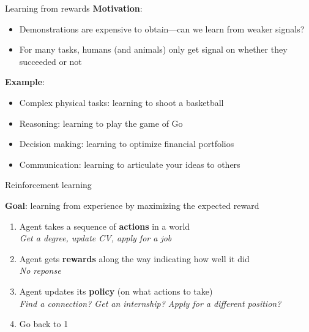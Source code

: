 \documentclass[usenames,dvipsnames,notes,11pt,aspectratio=169,hyperref={colorlinks=true, linkcolor=blue}]{beamer}
\begin{document}
\begin{frame}
    {Learning from rewards}
        \textbf{Motivation}:\\
            \begin{itemize}
                \item Demonstrations are expensive to obtain---can we learn from weaker signals?
                \item For many tasks, humans (and animals) only get signal on whether they succeeded or not 
            \end{itemize}

        \textbf{Example}:\\
            \begin{itemize}
                \item Complex physical tasks: learning to shoot a basketball 
                \item Reasoning: learning to play the game of Go 
                \item Decision making: learning to optimize financial portfolios
                \item Communication: learning to articulate your ideas to others
            \end{itemize}
\end{frame}

\begin{frame}
    {Reinforcement learning}

            {\bf Goal}: learning from experience by maximizing the expected reward\pause
            \begin{enumerate}[<+->]
                \item Agent takes a sequence of \textbf{actions} in a world \hfill {}\\
                    {\em Get a degree, update CV, apply for a job}
                \item Agent gets \textbf{rewards} along the way indicating how well it did \hfill {}\\
                    {\em No reponse}
                \item Agent updates its \textbf{policy} (on what actions to take) \hfill {}\\
                    {\em Find a connection? Get an internship? Apply for a different position?}
                \item Go back to 1 \hfill {}
            \end{enumerate}
\end{frame}
\end{document}
